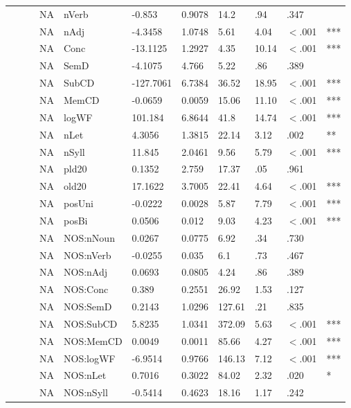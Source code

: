 \begin{table}[ht]
\begin{tabular}{lllllllllll}
   &  &  & NA & nVerb & -0.853 & 0.9078 & 14.2 & .94 & .347 &   \\ 
   &  &  & NA & nAdj & -4.3458 & 1.0748 & 5.61 & 4.04 & $<$.001 & *** \\ 
   &  &  & NA & Conc & -13.1125 & 1.2927 & 4.35 & 10.14 & $<$.001 & *** \\ 
   &  &  & NA & SemD & -4.1075 & 4.766 & 5.22 & .86 & .389 &   \\ 
   &  &  & NA & SubCD & -127.7061 & 6.7384 & 36.52 & 18.95 & $<$.001 & *** \\ 
   &  &  & NA & MemCD & -0.0659 & 0.0059 & 15.06 & 11.10 & $<$.001 & *** \\ 
   &  &  & NA & logWF & 101.184 & 6.8644 & 41.8 & 14.74 & $<$.001 & *** \\ 
   &  &  & NA & nLet & 4.3056 & 1.3815 & 22.14 & 3.12 & .002 & ** \\ 
   &  &  & NA & nSyll & 11.845 & 2.0461 & 9.56 & 5.79 & $<$.001 & *** \\ 
   &  &  & NA & pld20 & 0.1352 & 2.759 & 17.37 & .05 & .961 &   \\ 
   &  &  & NA & old20 & 17.1622 & 3.7005 & 22.41 & 4.64 & $<$.001 & *** \\ 
   &  &  & NA & posUni & -0.0222 & 0.0028 & 5.87 & 7.79 & $<$.001 & *** \\ 
   &  &  & NA & posBi & 0.0506 & 0.012 & 9.03 & 4.23 & $<$.001 & *** \\ 
   &  &  & NA & NOS:nNoun & 0.0267 & 0.0775 & 6.92 & .34 & .730 &   \\ 
   &  &  & NA & NOS:nVerb & -0.0255 & 0.035 & 6.1 & .73 & .467 &   \\ 
   &  &  & NA & NOS:nAdj & 0.0693 & 0.0805 & 4.24 & .86 & .389 &   \\ 
   &  &  & NA & NOS:Conc & 0.389 & 0.2551 & 26.92 & 1.53 & .127 &   \\ 
   &  &  & NA & NOS:SemD & 0.2143 & 1.0296 & 127.61 & .21 & .835 &   \\ 
   &  &  & NA & NOS:SubCD & 5.8235 & 1.0341 & 372.09 & 5.63 & $<$.001 & *** \\ 
   &  &  & NA & NOS:MemCD & 0.0049 & 0.0011 & 85.66 & 4.27 & $<$.001 & *** \\ 
   &  &  & NA & NOS:logWF & -6.9514 & 0.9766 & 146.13 & 7.12 & $<$.001 & *** \\ 
   &  &  & NA & NOS:nLet & 0.7016 & 0.3022 & 84.02 & 2.32 & .020 & * \\ 
   &  &  & NA & NOS:nSyll & -0.5414 & 0.4623 & 18.16 & 1.17 & .242 &   \\ 

\end{tabular}
\end{table}
